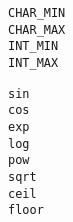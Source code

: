 \begin{frame}{}
  \centerline{\large {}}

  \begin{center}
    {\large
    \texttt{CHAR\_MIN}\\[0.10cm]
    \texttt{CHAR\_MAX}\\[0.40cm]

    \texttt{INT\_MIN}\\[0.10cm]
    \texttt{INT\_MAX}
    }
  \end{center}
\end{frame}

\begin{frame}{}
  \centerline{\large {}}

  \begin{center}
    {\large
    \texttt{sin}\\[0.10cm]
    \texttt{cos}\\[0.40cm]

    \texttt{exp}\\[0.10cm]
    \texttt{log}\\[0.40cm]

    \texttt{pow}\\[0.10cm]
    \texttt{sqrt}\\[0.40cm]

    \texttt{ceil}\\[0.10cm]
    \texttt{floor}\\[0.40cm]
    }
  \end{center}
\end{frame}

